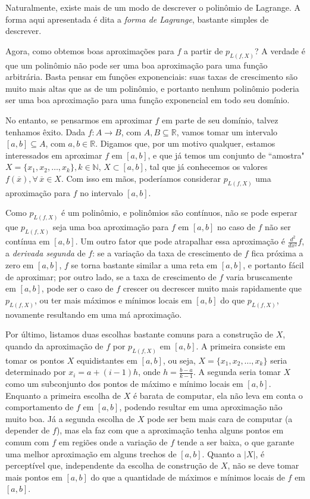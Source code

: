\documentclass[]{article}
\numberwithin{equation}{section}
\begin{document}
Naturalmente, existe mais de um modo de descrever o polinômio de
Lagrange. A forma aqui apresentada é dita a \emph{forma de Lagrange},
bastante simples de descrever.

Agora, como obtemos boas aproximações para $f$ a partir de
$p_{L(f, X)}$? A verdade é que um polinômio não pode ser uma boa
aproximação para uma função arbitrária. Basta pensar em funções
exponenciais: suas taxas de crescimento são muito mais altas que as de
um polinômio, e portanto nenhum polinômio poderia ser uma boa
aproximação para uma função exponencial em todo seu domínio.

No entanto, se pensarmos em aproximar $f$ em parte de seu domínio,
talvez tenhamos êxito. Dada $f : A \to B$, com
$A, B \subseteq \mathbb{R}$, vamos tomar um intervalo
$[a, b] \subseteq A$, com $a, b \in \mathbb{R}$. Digamos que, por um
motivo qualquer, estamos interessados em aproximar $f$ em $[a, b]$, e
que já temos um conjunto de ``amostra"
$X = \{x_1, x_2, \dots, x_k\}, k \in \mathbb{N}$, $X \subset [a, b]$,
tal que já conhecemos os valores
$f(\overline{x}), \forall\, \overline{x} \in X$. Com isso em mãos,
poderíamos considerar $p_{L(f, X)}$ uma aproximação para $f$ no
intervalo $[a, b]$.

Como $p_{L(f, X)}$ é um polinômio, e polinômios são contínuos, não se
pode esperar que $p_{L(f, X)}$ seja uma boa aproximação para $f$ em
$[a, b]$ no caso de $f$ não ser contínua em $[a, b]$. Um outro fator
que pode atrapalhar essa aproximação é $\frac{d^2}{dx^2} f$, a
\emph{derivada segunda} de $f$: se a variação da taxa de crescimento
de $f$ fica próxima a zero em $[a, b]$, $f$ se torna bastante similar
a uma reta em $[a, b]$, e portanto fácil de aproximar; por outro lado,
se a taxa de crescimento de $f$ varia bruscamente em $[a, b]$, pode
ser o caso de $f$ crescer ou decrescer muito mais rapidamente que
$p_{L(f, X)}$, ou ter mais máximos e mínimos locais em $[a, b]$ do que
$p_{L(f, X)}$, novamente resultando em uma má aproximação.

Por último, listamos duas escolhas bastante comuns para a construção
de $X$, quando da aproximação de $f$ por $p_{L(f, X)}$ em $[a, b]$. A
primeira consiste em tomar os pontos $X$ equidistantes em $[a, b]$, ou
seja, $X = \{x_1, x_2, \dots, x_k\}$ seria determinado por
$x_i = a + (i - 1)h$, onde $h = \frac{b - a}{k - 1}$. A segunda seria
tomar $X$ como um subconjunto dos pontos de máximo e mínimo locais em
$[a, b]$. Enquanto a primeira escolha de $X$ é barata de computar, ela
não leva em conta o comportamento de $f$ em $[a, b]$, podendo resultar
em uma aproximação não muito boa. Já a segunda escolha de $X$ pode ser
bem mais cara de computar (a depender de $f$), mas ela faz com que a
aproximação tenha alguns pontos em comum com $f$ em regiões onde a
variação de $f$ tende a ser baixa, o que garante uma melhor
aproximação em alguns trechos de $[a, b]$. Quanto a $|X|$, é
perceptível que, independente da escolha de construção de $X$, não se
deve tomar mais pontos em $[a, b]$ do que a quantidade de máximos e
mínimos locais de $f$ em $[a, b]$.
\end{document}
